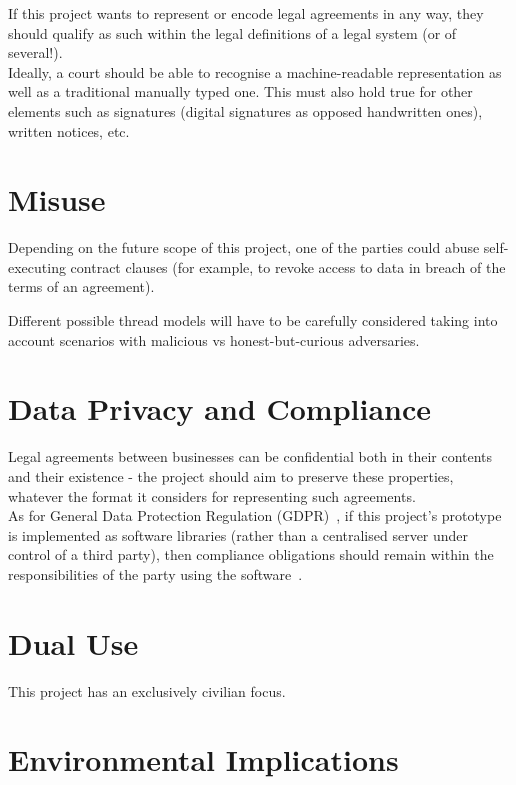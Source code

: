 If this project wants to represent or encode legal agreements in any way, they should qualify as
such within the legal definitions of a legal system (or of several!).\\

Ideally, a court should be able to recognise a machine-readable representation as well as a
traditional manually typed one.
This must also hold true for other elements such as signatures (digital signatures as opposed
handwritten ones), written notices, etc.


\section{Misuse}\label{sec:misuse}

Depending on the future scope of this project, one of the parties could abuse self-executing
contract clauses (for example, to revoke access to data in breach of the terms of an agreement).

Different possible thread models will have to be carefully considered taking into account scenarios
with malicious vs honest-but-curious adversaries.


\section{Data Privacy and Compliance}\label{sec:data-privacy-compliance}

Legal agreements between businesses can be confidential both in their contents and their existence -
the project should aim to preserve these properties, whatever the format it considers for
representing such agreements.\\

As for General Data Protection Regulation (GDPR)~\cite{gdprInfo}, if this project's prototype is
implemented as software libraries (rather than a centralised server under control of a third party),
then compliance obligations should remain within the responsibilities of the party using the
software~\citeTODO.


\section{Dual Use}\label{sec:dual-use}

This project has an exclusively civilian focus.


\section{Environmental Implications}\label{sec:environmental-implications}

